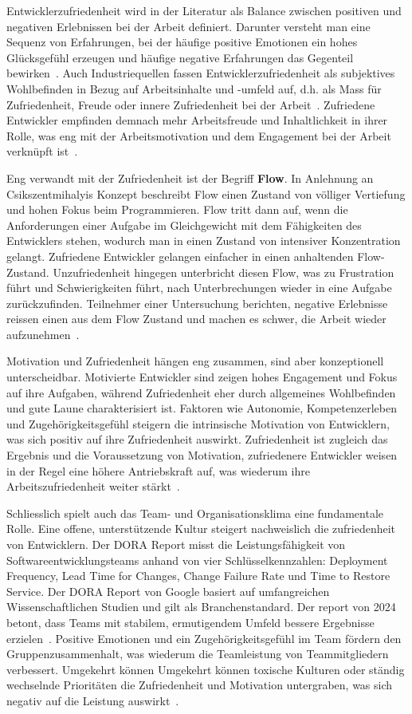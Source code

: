 \documentclass[12pt,a4paper]{report}
\begin{document}
Entwicklerzufriedenheit wird in der Literatur als Balance zwischen positiven und negativen Erlebnissen bei der
Arbeit definiert. Darunter versteht man eine Sequenz von Erfahrungen, bei der häufige positive Emotionen ein
hohes Glücksgefühl erzeugen und häufige negative Erfahrungen das Gegenteil bewirken~\cite{sadowski_happiness_2019}.
Auch Industriequellen fassen Entwicklerzufriedenheit als subjektives Wohlbefinden in Bezug auf Arbeitsinhalte
und -umfeld auf, d.h. als Mass für Zufriedenheit, Freude oder innere Zufriedenheit bei der Arbeit~\cite{zenhub_2022_nodate}.
Zufriedene Entwickler empfinden demnach mehr Arbeitsfreude und Inhaltlichkeit in ihrer Rolle, was eng mit
der Arbeitsmotivation und dem Engagement bei der Arbeit verknüpft ist~\cite{franca_motivation_2020}.

Eng verwandt mit der Zufriedenheit ist der Begriff \textbf{Flow}. In Anlehnung an Csikszentmihalyis Konzept beschreibt
Flow einen Zustand von völliger Vertiefung und hohen Fokus beim Programmieren. Flow tritt dann auf, wenn die Anforderungen
einer Aufgabe im Gleichgewicht mit dem Fähigkeiten des Entwicklers stehen, wodurch man in einen Zustand von intensiver 
Konzentration gelangt. Zufriedene Entwickler gelangen einfacher in einen anhaltenden Flow-Zustand. Unzufriedenheit
hingegen unterbricht diesen Flow, was zu Frustration führt und Schwierigkeiten führt, nach Unterbrechungen wieder in
eine Aufgabe zurückzufinden. Teilnehmer einer Untersuchung berichten, negative Erlebnisse reissen einen aus dem Flow
Zustand und machen es schwer, die Arbeit wieder aufzunehmen~\cite{sadowski_happiness_2019}.

Motivation und Zufriedenheit hängen eng zusammen, sind aber konzeptionell unterscheidbar. Motivierte Entwickler sind
zeigen hohes Engagement und Fokus auf ihre Aufgaben, während Zufriedenheit eher durch allgemeines Wohlbefinden und gute
Laune charakterisiert ist. Faktoren wie Autonomie, Kompetenzerleben und Zugehörigkeitsgefühl steigern die intrinsische
Motivation von Entwicklern, was sich positiv auf ihre Zufriedenheit auswirkt. Zufriedenheit ist zugleich das Ergebnis und
die Voraussetzung von Motivation, zufriedenere Entwickler weisen in der Regel eine höhere Antriebskraft auf, was wiederum ihre
Arbeitszufriedenheit weiter stärkt~\cite{franca_motivation_2020}.

Schliesslich spielt auch das Team- und Organisationsklima eine fundamentale Rolle. Eine offene, unterstützende Kultur steigert
nachweislich die zufriedenheit von Entwicklern. Der DORA Report misst die Leistungsfähigkeit von Softwareentwicklungsteams anhand
von vier Schlüsselkennzahlen: Deployment Frequency, Lead Time for Changes, Change Failure Rate und Time to Restore Service. Der DORA
Report von Google basiert auf umfangreichen Wissenschaftlichen Studien und gilt als Branchenstandard. Der report von 2024 betont,
dass Teams mit stabilem, ermutigendem Umfeld bessere Ergebnisse erzielen~\cite{google_dora_2024}. Positive Emotionen und ein
Zugehörigkeitsgefühl im Team fördern den Gruppenzusammenhalt, was wiederum die Teamleistung von Teammitgliedern verbessert. 
Umgekehrt können Umgekehrt können toxische Kulturen oder ständig wechselnde Prioritäten die Zufriedenheit und Motivation 
untergraben, was sich negativ auf die Leistung auswirkt~\cite{sadowski_happiness_2019}.
\end{document}
